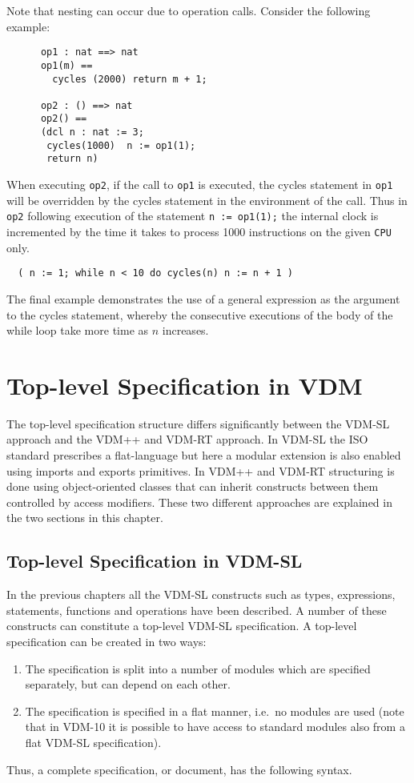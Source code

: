 \documentclass{overturerepchap}
\begin{document}
{\begin{description}
Note that nesting can occur due to operation calls. Consider the
following example:
\begin{lstlisting}
      op1 : nat ==> nat
      op1(m) ==
        cycles (2000) return m + 1;

      op2 : () ==> nat
      op2() ==
      (dcl n : nat := 3;
       cycles(1000)  n := op1(1);
       return n)
\end{lstlisting}
When executing \texttt{op2}, if the call to \texttt{op1} is
executed, the cycles statement in \texttt{op1} will be overridden by
the cycles statement in the environment of the call. Thus in
\texttt{op2} following execution of the statement
\texttt{n := op1(1);} the internal clock is incremented by the time
it takes to process 1000 instructions on the given \texttt{CPU}
only.

\begin{lstlisting}
  ( n := 1; while n < 10 do cycles(n) n := n + 1 )
\end{lstlisting}

The final example demonstrates the use of a general expression as the argument to the cycles statement, whereby the consecutive executions of the body of the while loop take more time as $n$ increases.

\end{description}


\chapter{Top-level Specification in VDM}
\label{top-level}

The top-level specification structure differs significantly between
the VDM-SL approach and the VDM++ and VDM-RT approach. In VDM-SL the
ISO standard prescribes a flat-language but here a modular extension
is also enabled using imports and exports primitives. In VDM++ and
VDM-RT structuring is done using object-oriented classes that can
inherit constructs between them controlled by access modifiers. These
two different approaches are explained in the two sections in this
chapter.

\section{Top-level Specification in VDM-SL}\label{modules}

In the previous chapters all the  VDM-SL constructs such as types,
expressions, statements, functions and operations have been described. A
number of these constructs can constitute a top-level  VDM-SL
specification. A top-level specification can be created in two ways:
\begin{enumerate}
\item The specification is split into a number of modules which are
  specified separately, but can depend on each other.
\item The specification is specified in a flat manner, i.e.\ no modules are
  used (note that in VDM-10 it is possible to have access to standard
  modules also from a flat VDM-SL specification).
\end{enumerate}
Thus, a complete specification, or document, has the following syntax.

}
\end{document}
